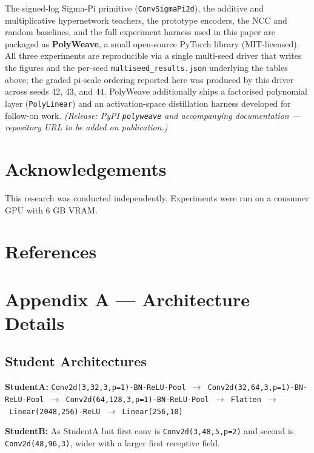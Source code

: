 \documentclass{article}
\begin{document}
The signed-log Sigma-Pi primitive (\texttt{ConvSigmaPi2d}), the additive and multiplicative hypernetwork teachers, the prototype encoders, the NCC and random baselines, and the full experiment harness used in this paper are packaged as \textbf{PolyWeave}, a small open-source PyTorch library (MIT-licensed). All three experiments are reproducible via a single multi-seed driver that writes the figures and the per-seed \texttt{multiseed\_results.json} underlying the tables above; the graded pi-scale ordering reported here was produced by this driver across seeds 42, 43, and 44. PolyWeave additionally ships a factorised polynomial layer (\texttt{PolyLinear}) and an activation-space distillation harness developed for follow-on work. \emph{(Release: PyPI \texttt{polyweave} and accompanying documentation --- repository URL to be added on publication.)}

\section{Acknowledgements}\label{acknowledgements}

This research was conducted independently. Experiments were run on a consumer GPU with 6 GB VRAM.

\section{References}\label{references}




\section{Appendix A --- Architecture Details}\label{appendix-a-architecture-details}

\subsection{Student Architectures}\label{student-architectures}

\textbf{StudentA:} \texttt{Conv2d(3,32,3,p=1)-BN-ReLU-Pool\ $\to$\ Conv2d(32,64,3,p=1)-BN-ReLU-Pool\ $\to$\ Conv2d(64,128,3,p=1)-BN-ReLU-Pool\ $\to$\ Flatten\ $\to$\ Linear(2048,256)-ReLU\ $\to$\ Linear(256,10)}

\textbf{StudentB:} As StudentA but first conv is \texttt{Conv2d(3,48,5,p=2)} and second is \texttt{Conv2d(48,96,3)}, wider with a larger first receptive field.
\end{document}
